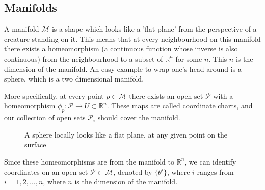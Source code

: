 \subsection{Manifolds}

A manifold $\mathcal{M}$ is a shape which looks like a 'flat plane' from the perspective of a creature standing on it. This means that at every neighbourhood on this manifold there exists a homeomorphism (a continuous function whose inverse is also continuous) from the neighbourhood to a subset of $\mathbb{R}^n$ for some $n$. This $n$ is the dimension of the manifold. An easy example to wrap one's head around is a sphere, which is a two dimensional manifold. 

More specifically, at every point $p \in \mathcal{M}$ there exists an open set $\mathcal{P} $ with a homeomorphism $\phi_p : \mathcal{ P } \rightarrow U \subset \mathbb{R}^n $. These maps are called coordinate charts, and our collection of open sets $\mathcal{ P}_i $ should cover the manifold. 
\begin{figure}[h]
	\centering 
{}
	\caption{A sphere locally looks like a flat plane, at any given point on the surface} 
\end{figure}

Since these homeomorphisms are from the manifold to $\mathbb{R}^n$, we can identify coordinates on an open set $\mathcal{P} \subset \mathcal{M}$, denoted by $\{ \theta^i \}$, where $i$ ranges from $i  = 1, 2, \dots, n$, where $n$ is the dimension of the manifold.

